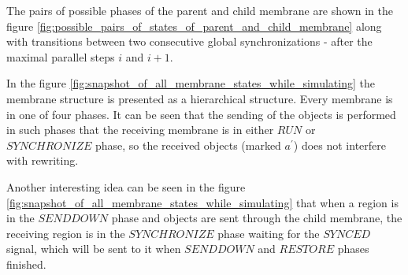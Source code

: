 \begin{dokaz}
  The pairs of possible phases of the parent and child membrane are shown in the figure \ref{fig:possible_pairs_of_states_of_parent_and_child_membrane} along with transitions between two consecutive global synchronizations - after the maximal parallel steps $i$ and $i+1$.

  In the figure \ref{fig:snapshot_of_all_membrane_states_while_simulating} the membrane structure is presented as a hierarchical structure. Every membrane is in one of four phases. It can be seen that the sending of the objects is performed in such phases that the receiving membrane is in either $RUN$ or $SYNCHRONIZE$ phase, so the received objects (marked $a^\prime$) does not interfere with rewriting.

  Another interesting idea can be seen in the figure \ref{fig:snapshot_of_all_membrane_states_while_simulating} that when a region is in the $SENDDOWN$ phase and objects are sent through the child membrane, the receiving region is in the $SYNCHRONIZE$ phase waiting for the $SYNCED$ signal, which will be sent to it when $SENDDOWN$ and $RESTORE$ phases finished.

\end{dokaz}
